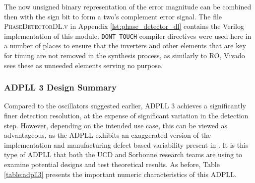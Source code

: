 The now unsigned binary representation of the error magnitude can be combined then with the sign bit to form a two's complement error signal. The file \textsc{PhaseDetectorDL.v} in Appendix \ref{lst:phase_detector_dl} contains the Verilog implementation of this module. \texttt{DONT\_TOUCH} compiler directives were used here in a number of places to ensure that the inverters and other elements that are key for timing are not removed in the synthesis process, as similarly to \ac{RO}, Vivado sees these as unneeded elements serving no purpose.

\subsubsection{\acs{ADPLL} 3 Design Summary}
Compared to the oscillators suggested earlier, \ac{ADPLL} 3 achieves a significantly finer detection resolution, at the expense of significant variation in the detection step. However, depending on the intended use case, this can be viewed as advantageous, as the \ac{ADPLL} exhibits an exaggerated version of the implementation and manufacturing defect based variability present in . It is this type of \ac{ADPLL} that both the \acs{UCD} and Sorbonne research teams are using to examine potential designs and test theoretical results. As before, Table \ref{table:adpll3} presents the important numeric characteristics of this \ac{ADPLL}.


